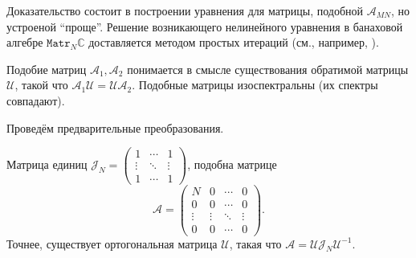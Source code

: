 Доказательство состоит в построении уравнения для матрицы, подобной \( \mathscr{A}_{MN} \),
 но устроеной ``проще''. Решение возникающего нелинейного уравнения
 в банаховой алгебре \( \mathtt{Matr}_N\mathbb{C} \)
 доставляется методом простых итераций (см., например, \cite{baskakov-harmonic}).

Подобие матриц \( \mathcal{A}_1, \mathcal{A}_2 \)
 понимается в смысле существования обратимой матрицы \( \mathcal{U} \),
 такой что \( \mathcal{A}_1 \mathcal{U} = \mathcal{U} \mathcal{A}_2 \).
Подобные матрицы изоспектральны (их спектры совпадают).

Провед\"ем предварительные преобразования.

\begin{lem}
    Матрица единиц 
    \( \mathcal{J}_N =
    \begin{pmatrix}
        1 & \cdots & 1 \\
        \vdots & \ddots & \vdots \\ 
    1 & \cdots & 1 \end{pmatrix} \),
    подобна матрице
    \[
        \mathcal{A} = \begin{pmatrix}
            N & 0 & \cdots & 0 \\
            0 & 0 & \cdots & 0 \\
            \vdots & \vdots & \ddots & \vdots \\
            0 & 0 & \cdots & 0 \end{pmatrix}. \]
    Точнее, существует ортогональная матрица \( \mathcal{U} \),
    такая что
    \( \mathcal{A} = \mathcal{U}\mathcal{J}_N \mathcal{U}^{-1} \).
\end{lem}
